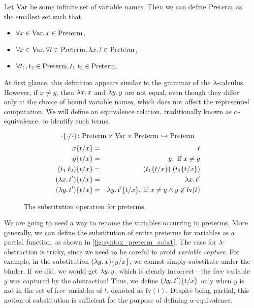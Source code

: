 \newcommand\Preterm{\syncatset{Preterm}}
\newcommand\Term{\syncatset{Term}}
\newcommand\Var{\syncatset{Var}}
\newcommand\FVars[1]{\mathrm{fv}(#1)}
\newcommand\Subst[3]{#1\{#2/#3\}}
\newcommand\Aeq{\equiv_\alpha}

Let $\Var$ be some infinite set of variable names.
Then we can define $\Preterm$ as the smallest set such that
\begin{itemize}
\item $\forall x \in \Var\ldotp x \in \Preterm$,
\item $\forall x \in \Var\ldotp\forall t \in \Preterm\ldotp \lambda x\ldotp t \in \Preterm$,
\item $\forall t_1, t_2 \in \Preterm\ldotp t_1\;t_2 \in \Preterm$.
\end{itemize}
At first glance, this definition appears similar to the grammar of the
$\lambda$-calculus.
However, if $x \neq y$, then $\lambda x\ldotp x$ and $\lambda y\ldotp y$ are
not equal, even though they differ only in the choice of bound variable names,
which does not affect the represented computation. We will define an
equivalence relation, traditionally known as $\alpha$-equivalence, to identify
such terms.

\begin{figure}[t!!]
\[
  \Subst{\cdot}{\cdot}{\cdot} \colon
  \Preterm \times \Var \times \Preterm \partialmap \Preterm
\]
\begin{eqnarray*}
  \Subst{x}{t}{x}          & = & t \\
  \Subst{y}{t}{x}          & = & y, \text{ if } x \ne y \\
  \Subst{(t_1\;t_2)}{t}{x} & = & (\Subst{t_1}{t}{x})\;(\Subst{t_1}{t}{x}) \\
  \Subst{(\lambda x\ldotp t')}{t}{x} & = & \lambda x\ldotp t' \\
  \Subst{(\lambda y\ldotp t')}{t}{x} & = & \lambda y\ldotp \Subst{t'}{t}{x}, \text{ if } x \ne y \land y \not\in \FVars{t}
\end{eqnarray*}
\caption{The substitution operation for preterms.}
\label{fig:syntax_preterm_subst}
\end{figure}

We are going to need a way to rename the variables occurring in preterms.
More generally, we can define the substitution of entire preterms for
variables as a partial function, as shown in
\autoref{fig:syntax_preterm_subst}.
The case for $\lambda$-abstraction is tricky, since we need to be careful
to avoid \emph{variable capture}.
For example, in the substitution $\Subst{(\lambda y\ldotp x)}{y}{x}$,
we cannot simply substitute under the binder. If we did, we would get
$\lambda y \ldotp y$, which is clearly incorrect---the free variable $y$ was
captured by the abstraction!
Thus, we define $\Subst{(\lambda y\ldotp t')}{t}{x}$ only when $y$ is not in
the set of free variables of $t$, denoted as $\FVars{t}$. Despite being
partial, this notion of substitution is sufficient for the purpose of defining
$\alpha$-equivalence.

